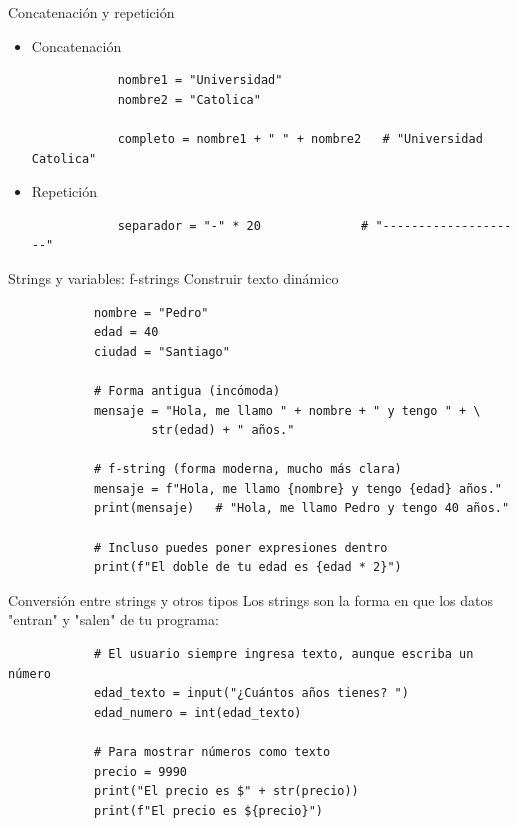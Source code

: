 \documentclass{beamer}
\begin{document}
    \begin{frame}[fragile, t]{Concatenación y repetición}
        \begin{itemize}
            \item Concatenación
            \begin{verbatim}
            nombre1 = "Universidad"
            nombre2 = "Catolica"

            completo = nombre1 + " " + nombre2   # "Universidad Catolica"
            \end{verbatim}
            \item Repetición
            \begin{verbatim}
            separador = "-" * 20              # "--------------------"
            \end{verbatim}
        \end{itemize}
    \end{frame}

    \begin{frame}[fragile, t]{Strings y variables: f-strings}
        Construir texto dinámico
        \begin{verbatim}
            nombre = "Pedro"
            edad = 40
            ciudad = "Santiago"
            
            # Forma antigua (incómoda)
            mensaje = "Hola, me llamo " + nombre + " y tengo " + \
                    str(edad) + " años."
            
            # f-string (forma moderna, mucho más clara)
            mensaje = f"Hola, me llamo {nombre} y tengo {edad} años."
            print(mensaje)   # "Hola, me llamo Pedro y tengo 40 años."
            
            # Incluso puedes poner expresiones dentro
            print(f"El doble de tu edad es {edad * 2}")
        \end{verbatim}
    \end{frame}

    \begin{frame}[fragile, t]{Conversión entre strings y otros tipos}
        Los strings son la forma en que los datos "entran" y "salen" de tu programa:
        \begin{verbatim}
            # El usuario siempre ingresa texto, aunque escriba un número
            edad_texto = input("¿Cuántos años tienes? ")
            edad_numero = int(edad_texto)                
            
            # Para mostrar números como texto
            precio = 9990
            print("El precio es $" + str(precio))   
            print(f"El precio es ${precio}")        
        \end{verbatim}
    \end{frame}
\end{document}
